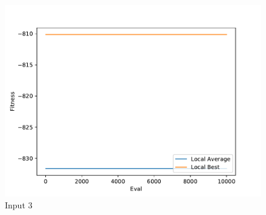 \documentclass{standalone}
\begin{document}
\begin{figure}[!htb]
	\caption{Input 3}
	\label{fig:graph_3051}
	\includegraphics[width=\textwidth]{../graphs/graphs/3051.pdf}
\end{figure}
\end{document}
